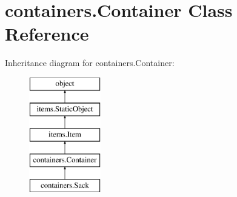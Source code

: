 \hypertarget{classcontainers_1_1_container}{}\section{containers.\+Container Class Reference}
\label{classcontainers_1_1_container}
Inheritance diagram for containers.\+Container\+:\begin{figure}[H]
\begin{center}
\leavevmode
\includegraphics[height=5.000000cm]{classcontainers_1_1_container}
\end{center}
\end{figure}
